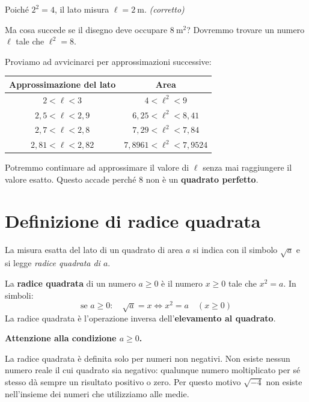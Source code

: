Poiché \(2^2 = 4\), il lato misura \(\ell = 2\ \text{m}\). \quad \textit{(corretto)}

\medskip

Ma cosa succede se il disegno deve occupare \(8\ \text{m}^2\)?
Dovremmo trovare un numero \(\ell\) tale che \(\ell^2 = 8\).

Proviamo ad avvicinarci per approssimazioni successive:

\begin{center}
    \begin{tabular}{cc}
        \toprule
        Approssimazione del lato   & Area                             \\
        \midrule
        \(2 < \ell < 3\)           & \(4 < \ell^2 < 9\)               \\
        \(2{,}5 < \ell < 2{,}9\)   & \(6{,}25 < \ell^2 < 8{,}41\)     \\
        \(2{,}7 < \ell < 2{,}8\)   & \(7{,}29 < \ell^2 < 7{,}84\)     \\
        \(2{,}81 < \ell < 2{,}82\) & \(7{,}8961 < \ell^2 < 7{,}9524\) \\
        \bottomrule
    \end{tabular}
\end{center}

Potremmo continuare ad approssimare il valore di \(\ell\) senza mai raggiungere
il valore esatto. Questo accade perché \(8\) non è un \textbf{quadrato perfetto}.

\section{Definizione di radice quadrata}

La misura esatta del lato di un quadrato di area \(a\) si indica con il simbolo
\(\sqrt{a}\) e si legge \emph{radice quadrata di \(a\)}.

\begin{definizione}
    La \textbf{radice quadrata} di un numero \(a \geq 0\) è il numero \(x \geq 0\)
    tale che \(x^2 = a\). In simboli:
    \[
        \text{se } a \geq 0 \colon \quad \sqrt{a} = x \iff x^2 = a \quad (x \geq 0)
    \]
    La radice quadrata è l'operazione inversa dell'\textbf{elevamento al quadrato}.
\end{definizione}

\begin{attenzione}
    \textbf{Attenzione alla condizione \(a \geq 0\).}

    La radice quadrata è definita solo per numeri non negativi. Non esiste nessun
    numero reale il cui quadrato sia negativo: qualunque numero moltiplicato per
    sé stesso dà sempre un risultato positivo o zero. Per questo motivo
    \(\sqrt{-4}\) non esiste nell'insieme dei numeri che utilizziamo alle medie.
\end{attenzione}

